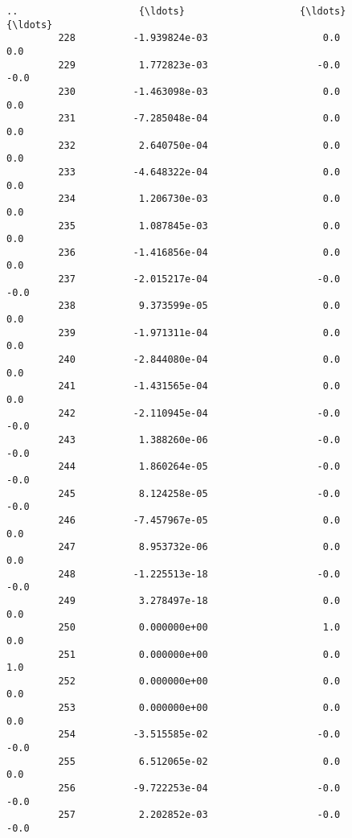 \documentclass[11pt]{article}
\begin{document}
\begin{Verbatim}[commandchars=\\\{\}]
         ..                     {\ldots}                    {\ldots}                    {\ldots}   
         228          -1.939824e-03                    0.0                    0.0   
         229           1.772823e-03                   -0.0                   -0.0   
         230          -1.463098e-03                    0.0                    0.0   
         231          -7.285048e-04                    0.0                    0.0   
         232           2.640750e-04                    0.0                    0.0   
         233          -4.648322e-04                    0.0                    0.0   
         234           1.206730e-03                    0.0                    0.0   
         235           1.087845e-03                    0.0                    0.0   
         236          -1.416856e-04                    0.0                    0.0   
         237          -2.015217e-04                   -0.0                   -0.0   
         238           9.373599e-05                    0.0                    0.0   
         239          -1.971311e-04                    0.0                    0.0   
         240          -2.844080e-04                    0.0                    0.0   
         241          -1.431565e-04                    0.0                    0.0   
         242          -2.110945e-04                   -0.0                   -0.0   
         243           1.388260e-06                   -0.0                   -0.0   
         244           1.860264e-05                   -0.0                   -0.0   
         245           8.124258e-05                   -0.0                   -0.0   
         246          -7.457967e-05                    0.0                    0.0   
         247           8.953732e-06                    0.0                    0.0   
         248          -1.225513e-18                   -0.0                   -0.0   
         249           3.278497e-18                    0.0                    0.0   
         250           0.000000e+00                    1.0                    0.0   
         251           0.000000e+00                    0.0                    1.0   
         252           0.000000e+00                    0.0                    0.0   
         253           0.000000e+00                    0.0                    0.0   
         254          -3.515585e-02                   -0.0                   -0.0   
         255           6.512065e-02                    0.0                    0.0   
         256          -9.722253e-04                   -0.0                   -0.0   
         257           2.202852e-03                   -0.0                   -0.0   
         

\end{Verbatim}
\end{document}
